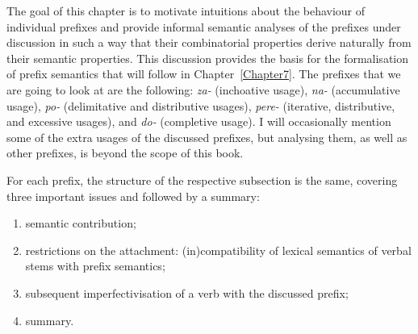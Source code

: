  

The goal of this chapter is to motivate intuitions about the behaviour of individual prefixes and provide informal semantic analyses of the prefixes under discussion in such a way that their combinatorial properties derive naturally from their semantic properties. 
This discussion provides the basis for the formalisation of prefix semantics that will follow in Chapter~\ref{Chapter7}. The prefixes that we are going to look at are the following: \textit{za-} (inchoative usage), \textit{na-} (accumulative usage), \textit{po-} (delimitative and distributive usages), \textit{pere-} (iterative, distributive, and excessive usages), and \textit{do-} (completive usage). I will occasionally mention some of the extra usages of the discussed prefixes, but analysing them, as well as other prefixes, is beyond the scope of this book.

For each prefix, the structure of the respective subsection is the same, covering three important issues and followed by a summary:
\begin{enumerate}
\item semantic contribution;
\item restrictions on the attachment: (in)compatibility of lexical semantics of verbal stems with prefix semantics;
\item subsequent imperfectivisation of a verb with the discussed prefix;
\item summary.
\end{enumerate}

